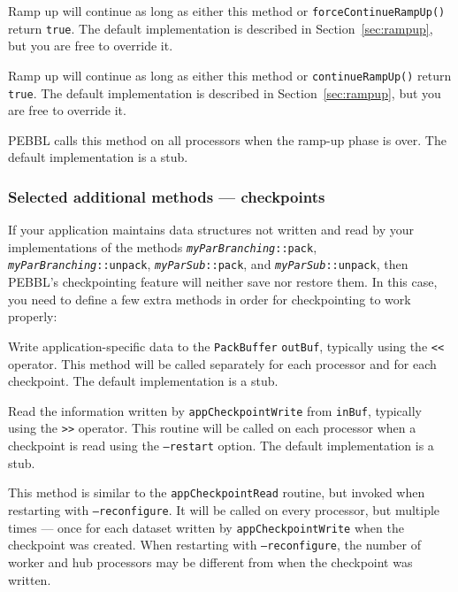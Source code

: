 Ramp up will
continue as long as either this method or
\texttt{forceContinueRampUp()} return \texttt{true}.  The default
implementation is described in Section~\ref{sec:rampup}, but you are
free to override it.

Ramp up will
continue as long as either this method or
\texttt{continueRampUp()} return \texttt{true}.  The default
implementation is described in Section~\ref{sec:rampup}, but you are
free to override it.

PEBBL calls this method on all processors when the ramp-up phase is
over.  The default implementation is a stub.

\subsubsection{Selected additional methods --- checkpoints}
If your application maintains data structures not written and read by
your implementations of the methods
\texttt{\emph{myParBranching}::\linebreak[0]pack},
\texttt{\emph{myParBranching}::\linebreak[0]unpack},
\texttt{\emph{myParSub}::\linebreak[0]pack}, and
\texttt{\emph{myParSub}::\linebreak[0]unpack}, then PEBBL's
checkpointing feature will neither save nor restore them.  In this
case, you need to define a few extra methods in order for
checkpointing to work properly:

Write application-specific data to the \texttt{PackBuffer}
  \texttt{outBuf}, typically using the \texttt{<<} operator.  This method
  will be called separately for each processor and for each
  checkpoint.  The default implementation is a stub.

Read the information written by \texttt{appCheckpointWrite} from
\texttt{inBuf}, typically using the \texttt{>>} operator.  This
routine will be called on each processor when a checkpoint is read
using the \texttt{--restart} option.  The default implementation is a stub.

This method is similar to the \texttt{appCheckpointRead}
routine, but invoked when restarting with \texttt{--reconfigure}.  It
will be called on every processor, but multiple times --- once for
each dataset written by \texttt{appCheckpointWrite} when the
checkpoint was created.  When restarting with \texttt{--reconfigure},
the number of worker and hub processors may be different from when the
checkpoint was written.

